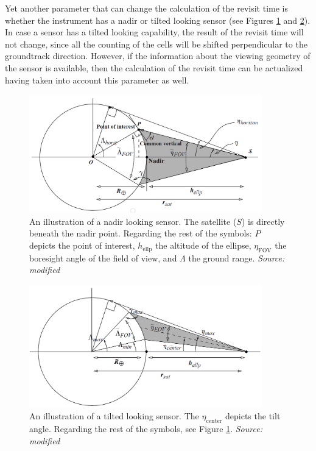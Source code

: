 Yet another parameter that can change the calculation of the revisit time is whether the instrument has a nadir or tilted looking sensor (see Figures \ref{nadir_looking} and \ref{tilted_looking}). In case a sensor has a tilted looking capability, the result of the revisit time will not change, since all the counting of the cells will be shifted perpendicular to the groundtrack direction. However, if the information about the viewing geometry of the sensor is available, then the calculation of the revisit time can be actualized having taken into account this parameter as well.

\begin{figure}
\centering
\includegraphics[width=0.9\textwidth]{Images/nadir_looking.png}\caption{An illustration of a nadir looking sensor. The satellite ($S$) is directly beneath the nadir point. Regarding the rest of the symbols: $P$ depicts the point of interest, $h_{\text{ellp}}$ the altitude of the ellipse, $\eta_{\text{FOV}}$ the boresight angle of the field of view, and $\Lambda$ the ground range. \textit{Source: modified \cite{Vallado}}}
\label{nadir_looking}
\end{figure}

\begin{figure}
\centering
\includegraphics[width=0.9\textwidth]{Images/tilted_looking.png}\caption{An illustration of a tilted looking sensor. The $\eta_{\text{center}}$ depicts the tilt angle. Regarding the rest of the symbols, see Figure \ref{nadir_looking}. \textit{Source: modified \cite{Vallado}}}
\label{tilted_looking}
\end{figure}

